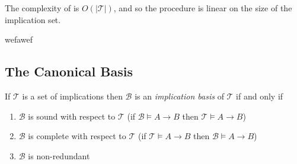 \begin{proposition}
	\label{proposition:complexity-lin-closure}

	The complexity of  is $O(\vert \mathcal{T}\vert)$, and so the procedure is linear on the
	size of the implication set.
\end{proposition}





\begin{corollary}
	\label{corollary:closure-system-intents} wefawef
\end{corollary}

\subsection{The Canonical Basis}
\label{subsection:the-canonical-basis}

\begin{definition}
	\label{definition:implication-basis} If $\mathcal{T}$ is a set of implications then $\mathcal{B}$ is an \emph{implication
	basis} of $\mathcal{T}$ if and only if
	\begin{enumerate}
		\item $\mathcal{B}$ is sound with respect to $\mathcal{T}$ (if $\mathcal{B}\vDash A \rightarrow B$ then
			$\mathcal{T}\vDash A \rightarrow B$)

		\item $\mathcal{B}$ is complete with respect to $\mathcal{T}$ (if $\mathcal{T}\vDash A \rightarrow B$ then
			$\mathcal{B}\vDash A \rightarrow B$)

		\item $\mathcal{B}$ is non-redundant
	\end{enumerate}
\end{definition}

